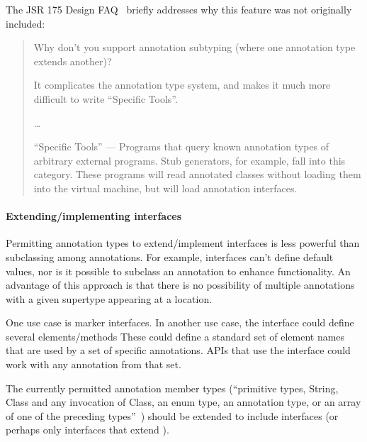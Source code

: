 \documentclass[10pt]{article}
\begin{document}
The JSR 175 Design FAQ~\cite{JSR175-PFD2} briefly addresses why this
feature was not originally included:

\begin{quote}
Why don't you support annotation subtyping (where one annotation type
extends another)?

It complicates the annotation type system, and makes it much more difficult
to write ``Specific Tools''.

\ldots

``Specific Tools'' --- Programs that query known annotation types of
arbitrary external programs. Stub generators, for example, fall into this
category. These programs will read annotated classes without loading them
into the virtual machine, but will load annotation interfaces.
\end{quote}




\paragraph{Extending/implementing interfaces}

Permitting annotation types to extend/implement interfaces is less
powerful than subclassing among annotations.
For example, interfaces can't define default values, nor is it possible
to subclass an annotation to enhance functionality.
An advantage of this approach is that there is no possibility of multiple
annotations with a given supertype appearing at a location.

One use case is marker interfaces.
%
In another use case, the interface could define several elements/methods
These could define a standard set of element names that are used by a set
of specific annotations.  APIs that use the interface could work with any
annotation from that set.

The currently permitted annotation member types (``primitive types, String,
Class and any invocation of Class, an enum type, an annotation type, or an
array of one of the preceding types''~\cite[\S9.6]{GoslingJSB2005}) should
be extended to include interfaces (or perhaps only interfaces that extend
).
\end{document}
